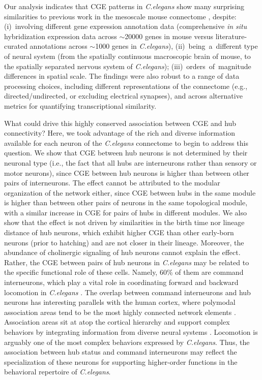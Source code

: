 {Our analysis indicates that CGE patterns in \emph{C.elegans} show many surprising similarities to previous work in the mesoscale mouse connectome \citep{Fulcher2016}, despite:
\mbox{(i) involving} different gene expression annotation data (comprehensive \emph{in situ} hybridization expression data across $\sim$\num{20000} genes in mouse versus literature-curated annotations across $\sim$\num{1000} genes in \emph{C.elegans}),
\mbox{(ii) being a }different type of neural system (from the spatially continuous macroscopic brain of mouse, to the spatially separated nervous system of \emph{C.elegans});
\mbox{(iii) orders of }magnitude differences in spatial scale.
The findings were also robust to a range of data processing choices, including different representations of the connectome (e.g., directed/undirected, or excluding electrical synapses), and across alternative metrics for quantifying transcriptional similarity.

What could drive this highly conserved association between CGE and hub connectivity?
Here, we took advantage of the rich and diverse information available for each neuron of the \emph{C.elegans} connectome to begin to address this question.
We show that CGE between hub neurons is not determined by their neuronal type (i.e., the fact that all hubs are interneurons rather than sensory or motor neurons), since CGE between hub neurons is higher than between other pairs of interneurons.
The effect cannot be attributed to the modular organization of the network either, since CGE between hubs in the same module is higher than between other pairs of neurons in the same topological module, with a similar increase in CGE for pairs of hubs in different modules.
We also show that the effect is not driven by similarities in the birth time nor lineage distance of hub neurons, which exhibit higher CGE than other early-born neurons (prior to hatching) and are not closer in their lineage.
Moreover, the abundance of cholinergic signaling of hub neurons cannot explain the effect.
Rather, the CGE between pairs of hub neurons in \textit{C.elegans} may be related to the specific functional role of these cells.
Namely, 60\% of them are command interneurons, which play a vital role in coordinating forward and backward locomotion in \textit{C.elegans} \citep{Kim2016}.
The overlap between command interneurons and hub neurons has interesting parallels with the human cortex, where polymodal association areas tend to be the most highly connected network elements \mbox{\citep{VandenHeuvel2016}}.
Association areas sit at atop the cortical hierarchy and support complex behaviors by integrating information from diverse neural systems \citep{Mesulam1998}.
Locomotion is arguably one of the most complex behaviors expressed by \emph{C.elegans}.
Thus, the association between hub status and command interneurons may reflect the specialization of these neurons for supporting higher-order functions in the behavioral repertoire of \emph{C.elegans}.

}
